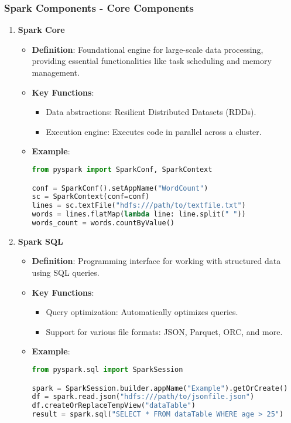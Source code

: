 \documentclass{beamer}
\begin{document}
\begin{frame}[fragile]
    \frametitle{Spark Components - Core Components}
    \begin{enumerate}
        \item \textbf{Spark Core}
            \begin{itemize}
                \item \textbf{Definition}: Foundational engine for large-scale data processing, providing essential functionalities like task scheduling and memory management.
                \item \textbf{Key Functions}:
                    \begin{itemize}
                        \item Data abstractions: Resilient Distributed Datasets (RDDs).
                        \item Execution engine: Executes code in parallel across a cluster.
                    \end{itemize}
                \item \textbf{Example}:
                \begin{lstlisting}[language=Python]
from pyspark import SparkConf, SparkContext

conf = SparkConf().setAppName("WordCount")
sc = SparkContext(conf=conf)
lines = sc.textFile("hdfs:///path/to/textfile.txt")
words = lines.flatMap(lambda line: line.split(" "))
words_count = words.countByValue()
                \end{lstlisting}
            \end{itemize}
          
        \item \textbf{Spark SQL}
            \begin{itemize}
                \item \textbf{Definition}: Programming interface for working with structured data using SQL queries.
                \item \textbf{Key Functions}:
                    \begin{itemize}
                        \item Query optimization: Automatically optimizes queries.
                        \item Support for various file formats: JSON, Parquet, ORC, and more.
                    \end{itemize}
                \item \textbf{Example}:
                \begin{lstlisting}[language=Python]
from pyspark.sql import SparkSession

spark = SparkSession.builder.appName("Example").getOrCreate()
df = spark.read.json("hdfs:///path/to/jsonfile.json")
df.createOrReplaceTempView("dataTable")
result = spark.sql("SELECT * FROM dataTable WHERE age > 25")
                \end{lstlisting}
            \end{itemize}
    \end{enumerate}
\end{frame}
\end{document}
